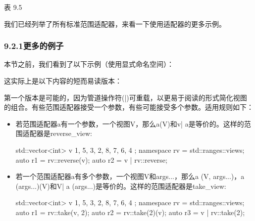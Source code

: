 \begin{center}
表 9.5
\end{center}

我们已经列举了所有标准范围适配器，来看一下使用适配器的更多示例。

\subsubsection{9.2.1\hspace{0.2cm}更多的例子}

本节之前，我们看到了以下示例（使用显式命名空间）：


这实际上是以下内容的短而易读版本：


第一个版本是可能的，因为管道操作符(|)可重载，以更易于阅读的形式简化视图的组合。有些范围适配器接受一个参数，有些可能接受多个参数。适用规则如下：

\begin{itemize}
\item
若范围适配器a有一个参数，一个视图V，那么a(V)和v| a是等价的。这样的范围适配器是reverse\_view:

\begin{cpp}
std::vector<int> v{ 1, 5, 3, 2, 8, 7, 6, 4 };
namespace rv = std::ranges::views;
auto r1 = rv::reverse(v);
auto r2 = v | rv::reverse;
\end{cpp}

\item
若一个范围适配器a有多个参数，一个视图V和args...，那么a (V, args...)，a (args...)(V)和V| a (args...)是等价的。这样的范围适配器是take\_view:

\begin{cpp}
std::vector<int> v{ 1, 5, 3, 2, 8, 7, 6, 4 };
namespace rv = std::ranges::views;
auto r1 = rv::take(v, 2);
auto r2 = rv::take(2)(v);
auto r3 = v | rv::take(2);
\end{cpp}

\end{itemize}

